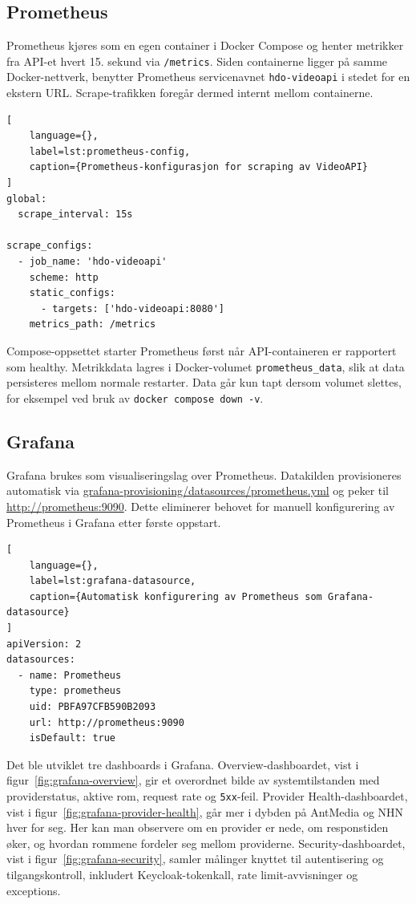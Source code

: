 \subsection{Prometheus}

Prometheus kjøres som en egen container i Docker Compose og henter metrikker fra API-et hvert 15. sekund via \texttt{/metrics}. Siden containerne ligger på samme Docker-nettverk, benytter Prometheus servicenavnet \texttt{hdo-videoapi} i stedet for en ekstern URL. Scrape-trafikken foregår dermed internt mellom containerne.

\begin{lstlisting}[
    language={},
    label=lst:prometheus-config,
    caption={Prometheus-konfigurasjon for scraping av VideoAPI}
]
global:
  scrape_interval: 15s

scrape_configs:
  - job_name: 'hdo-videoapi'
    scheme: http
    static_configs:
      - targets: ['hdo-videoapi:8080']
    metrics_path: /metrics
\end{lstlisting}

Compose-oppsettet starter Prometheus først når API-containeren er rapportert som healthy. Metrikkdata lagres i Docker-volumet \texttt{prometheus\_data}, slik at data persisteres mellom normale restarter. Data går kun tapt dersom volumet slettes, for eksempel ved bruk av \texttt{docker compose down -v}.

\subsection{Grafana}

Grafana brukes som visualiseringslag over Prometheus. Datakilden provisioneres automatisk via \url{grafana-provisioning/datasources/prometheus.yml} og peker til \url{http://prometheus:9090}. Dette eliminerer behovet for manuell konfigurering av Prometheus i Grafana etter første oppstart.

\begin{lstlisting}[
    language={},
    label=lst:grafana-datasource,
    caption={Automatisk konfigurering av Prometheus som Grafana-datasource}
]
apiVersion: 2
datasources:
  - name: Prometheus
    type: prometheus
    uid: PBFA97CFB590B2093
    url: http://prometheus:9090
    isDefault: true
\end{lstlisting}

Det ble utviklet tre dashboards i Grafana. Overview-dashboardet, vist i figur~\ref{fig:grafana-overview}, gir et overordnet bilde av systemtilstanden med providerstatus, aktive rom, request rate og \texttt{5xx}-feil. Provider Health-dashboardet, vist i figur~\ref{fig:grafana-provider-health}, går mer i dybden på AntMedia og NHN hver for seg. Her kan man observere om en provider er nede, om responstiden øker, og hvordan rommene fordeler seg mellom providerne. Security-dashboardet, vist i figur~\ref{fig:grafana-security}, samler målinger knyttet til autentisering og tilgangskontroll, inkludert Keycloak-tokenkall, rate limit-avvisninger og exceptions.

